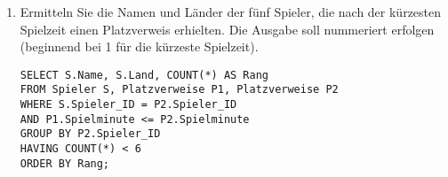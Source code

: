 \documentclass{lehramt-informatik-aufgabe}
\begin{document}
\begin{enumerate}

\item Ermitteln Sie die Namen und Länder der fünf Spieler, die nach der
kürzesten Spielzeit einen Platzverweis erhielten. Die Ausgabe soll
nummeriert erfolgen (beginnend bei 1 für die kürzeste Spielzeit).

\begin{liAntwort}
\begin{verbatim}
SELECT S.Name, S.Land, COUNT(*) AS Rang
FROM Spieler S, Platzverweise P1, Platzverweise P2
WHERE S.Spieler_ID = P2.Spieler_ID
AND P1.Spielminute <= P2.Spielminute
GROUP BY P2.Spieler_ID
HAVING COUNT(*) < 6
ORDER BY Rang;
\end{verbatim}
\end{liAntwort}

\end{enumerate}
\end{document}
